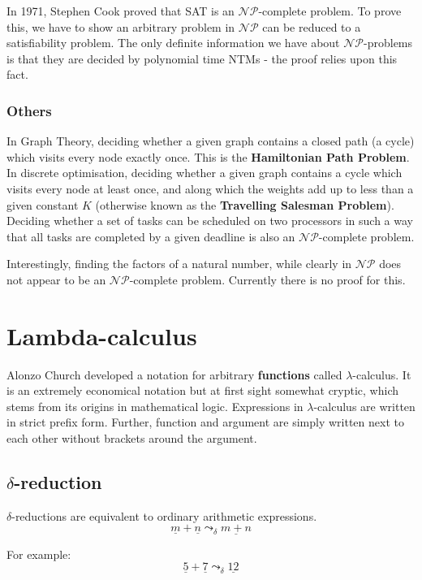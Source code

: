 \documentclass[11pt]{article}
\begin{document}
	\par 
	In 1971, Stephen Cook proved that SAT is an $\mathcal{NP}$-complete problem. To prove this, we have to show an arbitrary problem in $\mathcal{NP}$ can be reduced to a satisfiability problem. The only definite information we have about $\mathcal{NP}$-problems is that they are decided by polynomial time NTMs - the proof relies upon this fact.
	
	\subsubsection{Others}
	In Graph Theory, deciding whether a given graph contains a closed path (a cycle) which visits every node exactly once. This is the \textbf{Hamiltonian Path Problem}. In discrete optimisation, deciding whether a given graph contains a cycle which visits every node at least once, and along which the weights add up to less than a given constant $K$ (otherwise known as the \textbf{Travelling Salesman Problem}). Deciding whether a set of tasks can be scheduled on two processors in such a way that all tasks are completed by a given deadline is also an $\mathcal{NP}$-complete problem. 
	\par 
	Interestingly, finding the factors of a natural number, while clearly in $\mathcal{NP}$ does not appear to be an $\mathcal{NP}$-complete problem. Currently there is no proof for this.
	
	\section{Lambda-calculus}
	Alonzo Church developed a notation for arbitrary \textbf{functions} called $\lambda$-calculus. It is an extremely economical notation but at first sight somewhat cryptic, which stems from its origins in mathematical logic. Expressions in $\lambda$-calculus are written in strict prefix form. Further, function and argument are simply written next to each other without brackets around the argument.
	
	\subsection{$\delta$-reduction}
	$\delta$-reductions are equivalent to ordinary arithmetic expressions. 
	\[ \underline{m} + \underline{n} \leadsto_{\delta} \underline{m + n}\]
	
	For example:
	\[ \underline{5} + \underline{7} \leadsto_{\delta} \underline{12} \]
\end{document}
